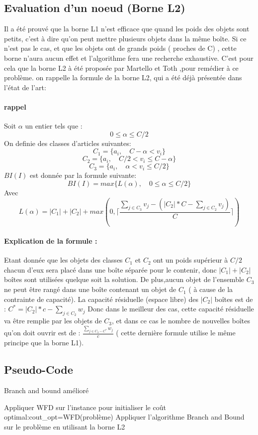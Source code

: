 \documentclass[12pt]{article}
\begin{document}
\subsection{Evaluation d'un noeud (Borne L2)}
Il a été prouvé que la borne L1 n’est efficace que quand les poids des objets sont petits, c’est à dire qu’on peut mettre plusieurs objets dans la même boîte. Si ce n’est pas le cas, et que les objets ont de grands poids ( proches de C) , cette borne n’aura aucun effet et l’algorithme fera une recherche exhaustive. 
C’est pour cela que la borne L2 à été proposée par Martello et Toth ,pour remédier à ce problème. 
on rappelle la formule de la borne L2, qui a été déjà présentée dans l’état de l’art:
\paragraph{rappel}
Soit \(\alpha\) un entier tels que :
\[0 \le \alpha \le C/2\]
On definie des classes d'articles suivantes: 
\[C_1 = \{a_i, \quad C-\alpha < v_i\} \]
\[C_2 = \{a_i, \quad C/2 < v_i \le C-\alpha\} \]
\[C_3 = \{a_i, \quad \alpha < v_i \le C/2\} \]
\(BI(I)\)  est donnée par la formule suivante:
\[BI(I)=max\{L(\alpha),\quad 0 \le \alpha \le C/2\}\]
Avec
\[L(\alpha)=|C_1|+|C_2|+max(0, \lceil{\frac{\sum_{j \in C_3}^{} v_j - (|C_2|*C - \sum_{j \in C_2}^{} v_j) }{C}}\rceil)\]
\paragraph{Explication de la formule :}
Etant donnée que les objets des classes $C_1$ et $C_2$ ont un poids supérieur à $C/2$ chacun d'eux sera placé dans une boîte séparée pour le contenir, donc
$|C_1|+|C_2|$boîtes sont utilisées quelque soit la solution. De plus,aucun objet de l’ensemble $C_3$ ne peut être rangé dans une boîte contenant un objet de $C_1$ ( à cause de la contrainte de capacité). La capacité résiduelle (espace libre) des
$|C_2|$ boîtes est de : $C^*=|C_2|*c-\sum_{j \in C_2}^{} w_j$
Donc dans le meilleur des cas, cette capacité résiduelle va être remplie par les objets de $C_3$, et dans ce cas le nombre de nouvelles boîtes qu’on doit ouvrir est de :  
$\frac{\sum_{j \in C_3 -C^*}^{} w_j}{c}$ ( cette dernière formule utilise le même principe que la borne L1).
\subsection{Pseudo-Code}
\begin{algorithm}[H]
   \caption{Branch and bound amélioré }
   \begin{algorithmic} 
   \STATE Appliquer WFD sur l’instance pour initialiser le coût optimal:\linebreak cout\_opt=WFD(problème)
   \STATE Appliquer l’algorithme Branch and Bound sur le problème en utilisant la borne L2
   \end{algorithmic} 
\end{algorithm}
\end{document}
